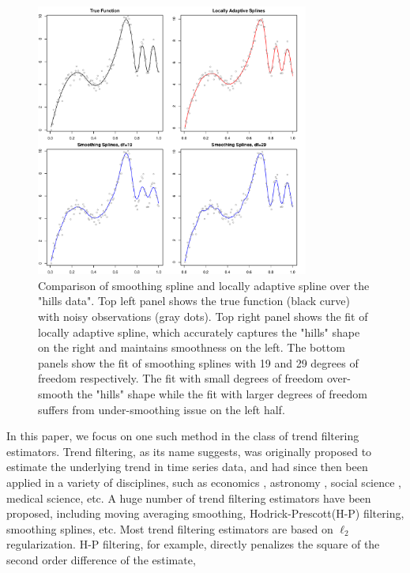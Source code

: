 \documentclass[a4paper]{article}
\begin{document}
\begin{figure}[t!]
\centering
\includegraphics[width = 0.8\textwidth]{Figures/ssvslars.pdf}
\caption{Comparison of smoothing spline and locally adaptive spline over the "hills data". Top left panel shows the true function (black curve) with noisy observations (gray dots). Top right panel shows the fit of locally adaptive spline, which accurately captures the "hills" shape on the right and maintains smoothness on the left. The bottom panels show the fit of smoothing splines with 19 and 29 degrees of freedom respectively. The fit with small degrees of freedom over-smooth the "hills" shape while the fit with larger degrees of freedom suffers from under-smoothing issue on the left half.}
\label{fig:ssvslars}
\end{figure}

In this paper, we focus on one such method in the class of trend filtering estimators. Trend filtering, as its name suggests, was originally proposed to estimate the underlying trend in time series data, and had since then been applied in a variety of disciplines, such as economics \cite{hodrick1997postwar,tsay2005analysis}, astronomy \cite{kovacs2008application}, social science \cite{saha2012learning,levitt2004understanding}, medical science\cite{greenland1992methods,link1994estimating}, etc. A huge number of trend filtering estimators have been proposed, including moving averaging smoothing\cite{leser1961simple,kendall1946advanced,lucas1980two}, Hodrick-Prescott(H-P) filtering\cite{hodrick1997postwar},  smoothing splines\cite{de1978practical,wahba1990spline,green1993nonparametric}, etc. Most trend filtering estimators are based on $\ell_2$ regularization. H-P filtering, for example, directly penalizes the square of the second order difference of the estimate,
\end{document}
